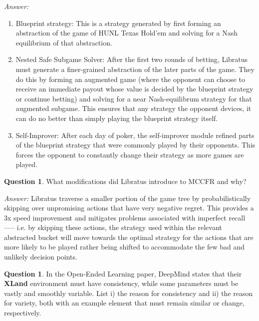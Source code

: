 \documentclass{article}
\theoremstyle{definition}
\newtheorem{question}[thm]{Question}
\newenvironment{answer}{\noindent\textit{Answer:}}{}
\begin{document}
\begin{answer}
\begin{enumerate}
\item Blueprint strategy: This is a strategy generated by first forming an abstraction of the game of HUNL Texas Hold’em and solving for a Nash equilibrium of that abstraction.
\item Nested Safe Subgame Solver: After the first two rounds of betting, Libratus must generate a finer-grained abstraction of the later parts of the game. They do this by forming an augmented game (where the opponent can choose to receive an immediate payout whose value is decided by the blueprint strategy or continue betting) and solving for a near Nash-equilibrum strategy for that augmented subgame. This ensures that any strategy the opponent devices, it can do no better than simply playing the blueprint strategy itself.   
\item Self-Improver: After each day of poker, the self-improver module refined parts of the blueprint strategy that were commonly played by their opponents. This forces the opponent to constantly change their strategy as more games are played. 
\end{enumerate}
\end{answer}

\begin{question}
What modifications did Libratus introduce to MCCFR and why?
\end{question}

\begin{answer}
Libratus traverse a smaller portion of the game tree by probabilistically skipping over unpromising actions that have very negative regret. This provides a 3x speed improvement and mitigates problems associated with imperfect recall —-- i.e. by skipping these actions, the strategy used within the relevant abstracted bucket will move towards the optimal strategy for the actions that are more likely to be played rather being shifted to accommodate the few bad and unlikely decision points. 
\end{answer}

\begin{question}
In the Open-Ended Learning paper, DeepMind states that their \textbf{XLand} environment must have consistency, while some parameters must be vastly and smoothly variable. List i) the reason for consistency and ii) the reason for variety, both with an example element that must remain similar or change, respectively.
\end{question}
\end{document}
